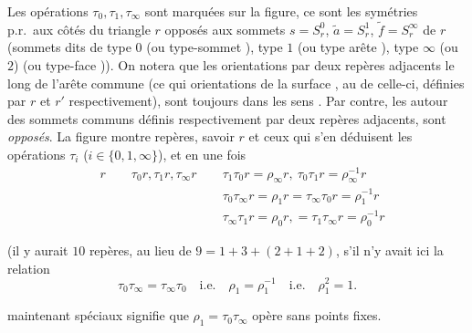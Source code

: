\documentclass[11pt,a4paper]{article}
\begin{document}


Les opérations $\tau_{0}, \tau_{1}, \tau_{\infty}$ sont marquées sur la figure, ce sont les \og symétries \fg{} p.r.\ aux côtés du triangle $r$ opposés aux sommets $s = S^{0}_{r}$, $\tilde a = S^{1}_{r}$, $\tilde f = S^{\infty}_{r}$ de $r$ (sommets dits de type $0$ (ou \og type-sommet \fg), type $1$ (ou \og type arête \fg), type $\infty$ (ou $2$) (ou \og type-face \fg)). On notera que les orientations  par deux repères \og adjacents \fg{} le long de l'arête commune (ce qui    orientations de la surface , au  de celle-ci, définies par $r$ et $r'$ respectivement), sont toujours dans les sens \og {} \fg. Par contre, les   autour des sommets communs définis \struck{\ill{}} respectivement par deux repères adjacents, sont \emph{opposés}. La figure montre  repères, savoir $r$ et ceux qui s'en déduisent \struck{\ill{}} les opérations $\tau_{i}$ ($i \in \{0, 1, \infty\}$), et en  \struck{\ill{}} une fois
\begin{align*}
  & r \qquad \tau_{0}r, \tau_{1}r, \tau_{\infty}r \qquad \tau_{1}\tau_{0}r = \rho_{\infty}r, \ \tau_{0}\tau_{1}r = \rho_{\infty}^{-1}r \\
  & \phantom{r \qquad \tau_{0}r, \tau_{1}r, \tau_{\infty}r \qquad} \tau_{0}\tau_{\infty}r = \rho_{1}r = \tau_{\infty}\tau_{0}r = \rho_{1}^{-1}r \\
  & \phantom{r \qquad \tau_{0}r, \tau_{1}r, \tau_{\infty}r \qquad} \tau_{\infty}\tau_{1}r = \rho_{0}r, = \tau_{1}\tau_{\infty}r = \rho_{0}^{-1}r
\end{align*}

(il y aurait $10$ repères, au lieu de $9 = 1 + 3 + (2 + 1 + 2)$, s'il n'y avait ici la relation
\[
  \tau_{0}\tau_{\infty} = \tau_{\infty}\tau_{0} \quad \text{i.e.} \quad \rho_{1} = \rho_{1}^{-1} \quad \text{i.e.} \quad \rho_{1}^{2} = 1 .
\]

\ill{} maintenant \og spéciaux \fg{} signifie que $\rho_{1} = \tau_{0}\tau_{\infty}$ opère sans points fixes.
\end{document}
